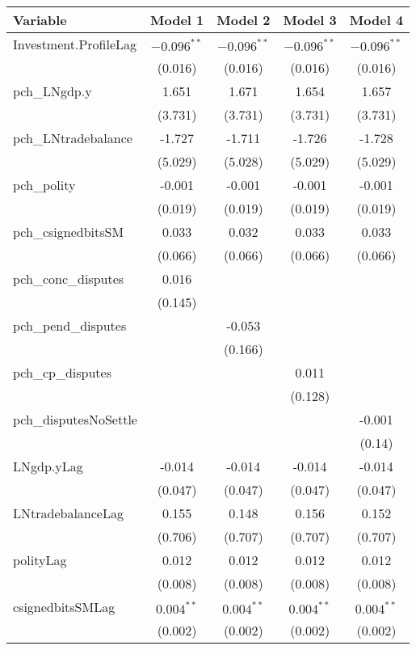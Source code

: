 \begin{table}[ht]
\centering
\begin{tabular}{lcccc}
 Variable & Model 1 & Model 2 & Model 3 & Model 4 \\ 
  \hline
\hline
Investment.ProfileLag & $-0.096^{\ast\ast}$ & $-0.096^{\ast\ast}$ & $-0.096^{\ast\ast}$ & $-0.096^{\ast\ast}$ \\ 
   & (0.016) & (0.016) & (0.016) & (0.016) \\ 
   \hline
pch\_LNgdp.y & 1.651 & 1.671 & 1.654 & 1.657 \\ 
   & (3.731) & (3.731) & (3.731) & (3.731) \\ 
  pch\_LNtradebalance & -1.727 & -1.711 & -1.726 & -1.728 \\ 
   & (5.029) & (5.028) & (5.029) & (5.029) \\ 
  pch\_polity & -0.001 & -0.001 & -0.001 & -0.001 \\ 
   & (0.019) & (0.019) & (0.019) & (0.019) \\ 
  pch\_csignedbitsSM & 0.033 & 0.032 & 0.033 & 0.033 \\ 
   & (0.066) & (0.066) & (0.066) & (0.066) \\ 
  pch\_conc\_disputes & 0.016 &  &  &  \\ 
   & (0.145) &  &  &  \\ 
  pch\_pend\_disputes &  & -0.053 &  &  \\ 
   &  & (0.166) &  &  \\ 
  pch\_cp\_disputes &  &  & 0.011 &  \\ 
   &  &  & (0.128) &  \\ 
  pch\_disputesNoSettle &  &  &  & -0.001 \\ 
   &  &  &  & (0.14) \\ 
   \hline
LNgdp.yLag & -0.014 & -0.014 & -0.014 & -0.014 \\ 
   & (0.047) & (0.047) & (0.047) & (0.047) \\ 
  LNtradebalanceLag & 0.155 & 0.148 & 0.156 & 0.152 \\ 
   & (0.706) & (0.707) & (0.707) & (0.707) \\ 
  polityLag & 0.012 & 0.012 & 0.012 & 0.012 \\ 
   & (0.008) & (0.008) & (0.008) & (0.008) \\ 
  csignedbitsSMLag & $0.004^{\ast\ast}$ & $0.004^{\ast\ast}$ & $0.004^{\ast\ast}$ & $0.004^{\ast\ast}$ \\ 
   & (0.002) & (0.002) & (0.002) & (0.002) \\ 

\end{tabular}
\end{table}
